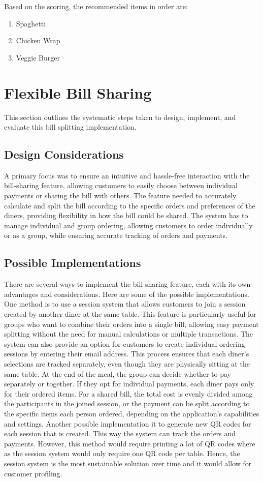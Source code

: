 Based on the scoring, the recommended items in order are:
\begin{enumerate}
    \item Spaghetti
    \item Chicken Wrap
    \item Veggie Burger
\end{enumerate}

\section{Flexible Bill Sharing}

This section outlines the systematic steps taken to design, implement, and evaluate this bill splitting implementation.

\subsection{Design Considerations}
A primary focus was to ensure an intuitive and hassle-free interaction with the bill-sharing feature, allowing customers to easily choose between individual payments or sharing the bill with others. The feature needed to accurately calculate and split the bill according to the specific orders and preferences of the diners, providing flexibility in how the bill could be shared. The system has to manage individual and group ordering, allowing customers to order individually or as a group, while ensuring accurate tracking of orders and payments.

\subsection*{Possible Implementations}
There are several ways to implement the bill-sharing feature, each with its own advantages and considerations. Here are some of the possible implementations. One method is to use a session system that allows customers to join a session created by another diner at the same table. This feature is particularly useful for groups who want to combine their orders into a single bill, allowing easy payment splitting without the need for manual calculations or multiple transactions. The system can also provide an option for customers to create individual ordering sessions by entering their email address. This process ensures that each diner's selections are tracked separately, even though they are physically sitting at the same table. At the end of the meal, the group can decide whether to pay separately or together. If they opt for individual payments, each diner pays only for their ordered items. For a shared bill, the total cost is evenly divided among the participants in the joined session, or the payment can be split according to the specific items each person ordered, depending on the application's capabilities and settings. Another possible implementation it to generate new QR codes for each session that is created. This way the system can track the orders and payments. However, this method would require printing a lot of QR codes where as the session system would only require one QR code per table. Hence, the session system is the most sustainable solution over time and it would allow for customer profiling.


